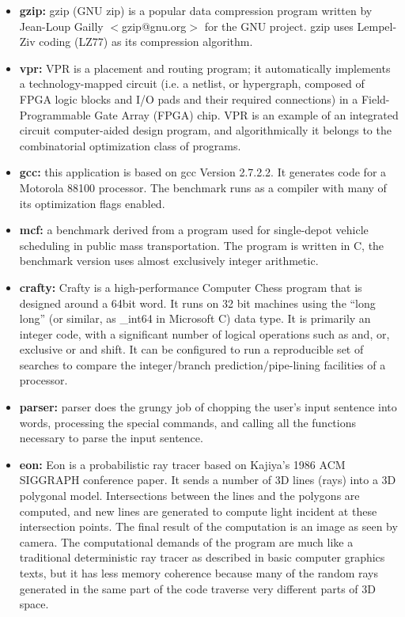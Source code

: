 \begin{itemize}
	\item \textbf{gzip:} gzip (GNU zip) is a popular data compression program written by Jean-Loup Gailly $<$gzip@gnu.org$>$ for the GNU project. gzip uses Lempel-Ziv coding (LZ77) as its compression algorithm.
	\item \textbf{vpr:} VPR is a placement and routing program; it automatically implements a technology-mapped circuit (i.e. a netlist, or hypergraph, composed of FPGA logic blocks and I/O pads and their required connections) in a Field-Programmable Gate Array (FPGA) chip.  VPR is an example of an integrated circuit computer-aided design program, and algorithmically it belongs to the combinatorial optimization class of programs.
	\item \textbf{gcc:} this application is based on gcc Version 2.7.2.2. It generates code for a Motorola 88100 processor. The benchmark runs as a compiler with many of its optimization flags enabled.
	\item \textbf{mcf:} a benchmark derived from a program used for single-depot vehicle scheduling in public mass transportation. The program is written in C, the benchmark version uses almost exclusively integer arithmetic.
	\item \textbf{crafty:} Crafty is a high-performance Computer Chess program that is designed around a 64bit word. It runs on 32 bit machines using the ``long long'' (or similar, as \_int64 in Microsoft C) data type.  It is primarily an integer code, with a significant number of logical operations such as and, or, exclusive or and shift.  It can be configured to run a reproducible set of searches to compare the integer/branch prediction/pipe-lining facilities of a processor.
	\item \textbf{parser:} parser does the grungy job of chopping the user's input sentence into words, processing the special commands, and calling all the functions necessary to parse the input sentence.
	\item \textbf{eon:} Eon is a probabilistic ray tracer based on Kajiya's 1986 ACM SIGGRAPH conference paper. It sends a number of 3D lines (rays) into a 3D polygonal model. Intersections between the lines and the polygons are computed, and new lines are generated to compute light incident at these intersection points. The final result of the computation is an image as seen by camera. The computational demands of the program are much like a traditional deterministic ray tracer as described in basic computer graphics texts, but it has less memory coherence because many of the random rays generated in the same part of the code traverse very different parts of 3D space.

\end{itemize}

